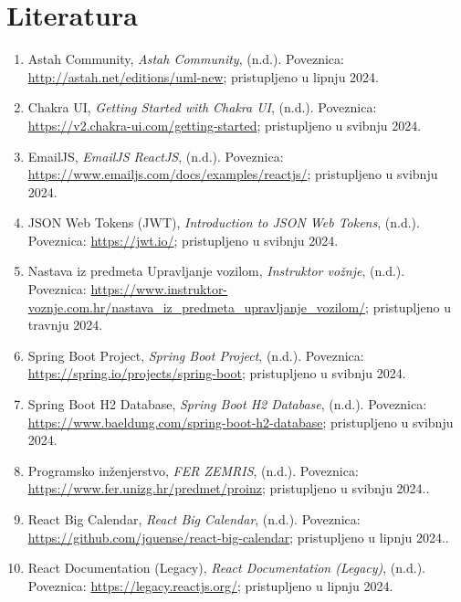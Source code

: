 \chapter*{Literatura}

\begin{enumerate}

    \item Astah Community, \emph{Astah Community}, (n.d.). Poveznica: \url{http://astah.net/editions/uml-new}; pristupljeno u lipnju 2024.

    \item Chakra UI, \emph{Getting Started with Chakra UI}, (n.d.). Poveznica: \url{https://v2.chakra-ui.com/getting-started}; pristupljeno u svibnju 2024.

    \item EmailJS, \emph{EmailJS ReactJS}, (n.d.). Poveznica: \url{https://www.emailjs.com/docs/examples/reactjs/}; pristupljeno u svibnju 2024.

    \item JSON Web Tokens (JWT), \emph{Introduction to JSON Web Tokens}, (n.d.). Poveznica: \url{https://jwt.io/}; pristupljeno u svibnju 2024.

    \item Nastava iz predmeta Upravljanje vozilom, \emph{Instruktor vožnje}, (n.d.). Poveznica: \url{https://www.instruktor-voznje.com.hr/nastava_iz_predmeta_upravljanje_vozilom/}; pristupljeno u travnju 2024.

    \item Spring Boot Project, \emph{Spring Boot Project}, (n.d.). Poveznica: \url{https://spring.io/projects/spring-boot}; pristupljeno u svibnju 2024.

    \item Spring Boot H2 Database, \emph{Spring Boot H2 Database}, (n.d.). Poveznica: \url{https://www.baeldung.com/spring-boot-h2-database}; pristupljeno u svibnju 2024.

    \item Programsko inženjerstvo, \emph{FER ZEMRIS}, (n.d.). Poveznica: \url{https://www.fer.unizg.hr/predmet/proinz}; pristupljeno u svibnju 2024..

    \item React Big Calendar, \emph{React Big Calendar}, (n.d.). Poveznica: \url{https://github.com/jquense/react-big-calendar}; pristupljeno u lipnju 2024..

    \item React Documentation (Legacy), \emph{React Documentation (Legacy)}, (n.d.). Poveznica: \url{https://legacy.reactjs.org/}; pristupljeno u lipnju 2024.

\end{enumerate}
